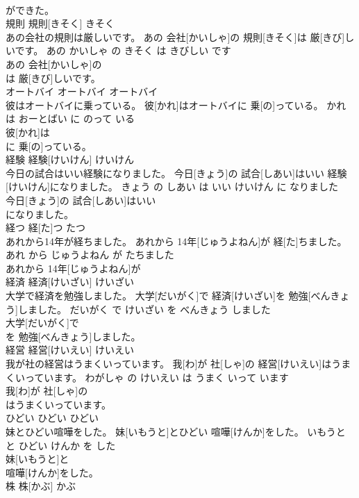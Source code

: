 \documentclass[8pt]{extreport}
\begin{document}
\begin{CJK}{UTF8}{min}
\\	ができた。		
\\	規則	規則[きそく]	きそく	
\\	あの会社の規則は厳しいです。	あの 会社[かいしゃ]の 規則[きそく]は 厳[きび]しいです。	あの かいしゃ の きそく は きびしい です	
\\	あの 会社[かいしゃ]の
\\	は 厳[きび]しいです。		
\\	オートバイ	オートバイ	オートバイ	
\\	彼はオートバイに乗っている。	彼[かれ]はオートバイに 乗[の]っている。	かれ は おーとばい に のって いる	
\\	彼[かれ]は
\\	に 乗[の]っている。		
\\	経験	経験[けいけん]	けいけん	
\\	今日の試合はいい経験になりました。	今日[きょう]の 試合[しあい]はいい 経験[けいけん]になりました。	きょう の しあい は いい けいけん に なりました	
\\	今日[きょう]の 試合[しあい]はいい
\\	になりました。		
\\	経つ	経[た]つ	たつ	
\\	あれから14年が経ちました。	あれから 14年[じゅうよねん]が 経[た]ちました。	あれ から じゅうよねん が たちました	
\\	あれから 14年[じゅうよねん]が
\\	経済	経済[けいざい]	けいざい	
\\	大学で経済を勉強しました。	大学[だいがく]で 経済[けいざい]を 勉強[べんきょう]しました。	だいがく で けいざい を べんきょう しました	
\\	大学[だいがく]で
\\	を 勉強[べんきょう]しました。		
\\	経営	経営[けいえい]	けいえい	
\\	我が社の経営はうまくいっています。	我[わ]が 社[しゃ]の 経営[けいえい]はうまくいっています。	わがしゃ の けいえい は うまく いって います	
\\	我[わ]が 社[しゃ]の
\\	はうまくいっています。		
\\	ひどい	ひどい	ひどい	
\\	妹とひどい喧嘩をした。	妹[いもうと]とひどい 喧嘩[けんか]をした。	いもうと と ひどい けんか を した	
\\	妹[いもうと]と
\\	喧嘩[けんか]をした。		
\\	株	株[かぶ]	かぶ	

\end{CJK}
\end{document}
